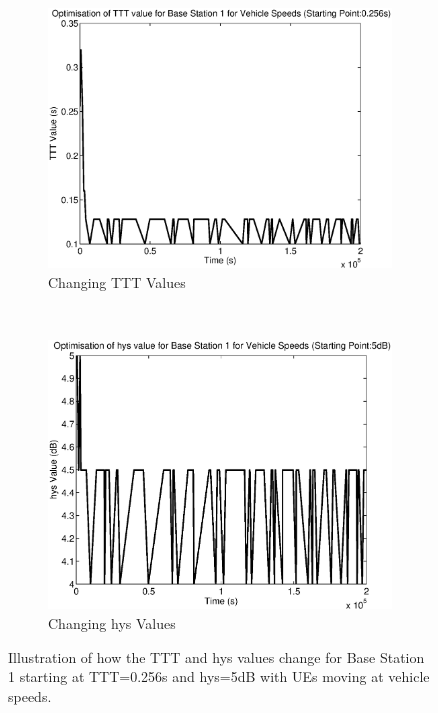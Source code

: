 \begin{figure}[H]
        \centering
        \begin{subfigure}[b]{0.49\textwidth}
                \includegraphics[width=\textwidth]{figures/graphs/vehmid/TTT1.eps}
                \caption{Changing TTT Values}
        \end{subfigure}%
        ~ %
        \begin{subfigure}[b]{0.49\textwidth}
                \includegraphics[width=\textwidth]{figures/graphs/vehmid/hys1.eps}
                \caption{Changing hys Values}
        \end{subfigure}
        \caption{Illustration of how the TTT and hys values change for Base Station 1 starting at TTT=0.256s and hys=5dB with UEs moving at vehicle speeds.}
\end{figure}
